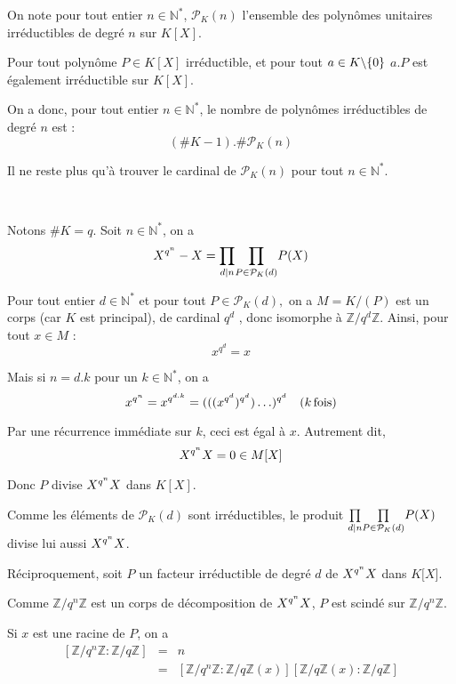On note pour tout entier $n \in \mathbb{N}^{\ast}$, $\mathcal{P}_K (n)$
l'ensemble des polyn{\^o}mes unitaires irr{\'e}ductibles de degr{\'e} $n$ sur
$K [X]$.

Pour tout polyn{\^o}me $P \in K [X]$ irr{\'e}ductible, et pour tout $a \in K
\backslash \nobracket \{ 0 \}$ $a.P$ est {\'e}galement irr{\'e}ductible sur $K
[X]$.

On a donc, pour tout entier $n \in \mathbb{N}^{\ast}$, le nombre de
polyn{\^o}mes irr{\'e}ductibles de degr{\'e} $n$ est :
\[ (\#K - 1) .\#\mathcal{P}_K (n) \]


Il ne reste plus qu'{\`a} trouver le cardinal de $\mathcal{P}_K (n)$ pour tout
$n \in \mathbb{N}^{\ast}$.

\


Notons $\#K = q$. Soit $n \in \mathbb{N}^{\ast}$, on a
\[ X^{q^n} - X = \underset{d | n \nobracket}{\prod}  \underset{P \in
   \mathcal{P}_K (d)}{\prod} P (X) \]



Pour tout entier $d \in \mathbb{N}^{\ast}$ et pour tout $P \in \mathcal{P}_K
(d),$ on a $M = K / (P)$ est un corps (car $K$ est principal), de cardinal
$q^d$ , donc isomorphe {\`a} $\mathbb{Z}/ q^d \mathbb{Z}$. Ainsi, pour tout $x
\in M$ :
\[ x^{q^d} = x \]


Mais si $n = d.k$ pour un $k \in \mathbb{N}^{\ast}$, on a \
\[ x^{q^n} = x^{q^{d.k}} = (((x^{q^d})^{q^d}) \ldots)^{q^d} \quad (k
   \tmop{fois}) \]


Par une r{\'e}currence imm{\'e}diate sur $k$, ceci est {\'e}gal {\`a} $x$.
Autrement dit,
\[ X^{q^n} \nonconverted{minus} X = 0 \in M [X] \]


Donc $P$ divise $X^{q^n} \nonconverted{minus} X$ dans $K [X]$.

Comme les {\'e}l{\'e}ments de $\mathcal{P}_K (d)$ sont irr{\'e}ductibles, le
produit $\underset{d | n \nobracket}{\prod}  \underset{P \in \mathcal{P}_K
(d)}{\prod} P (X)$ divise lui aussi $X^{q^n} \nonconverted{minus} X$.

R{\'e}ciproquement, soit $P$ un facteur irr{\'e}ductible de degr{\'e} $d$ de
$X^{q^n} \nonconverted{minus} X$ dans $K [X$].

Comme $\mathbb{Z}/ q^n \mathbb{Z}$ est un corps de d{\'e}composition de
$X^{q^n} \nonconverted{minus} X$, $P$ est scind{\'e} sur $\mathbb{Z}/ q^n
\mathbb{Z}$.

Si $x$ est une racine de $P$, on a
\begin{eqnarray*}
  {}[\mathbb{Z}/ q^n \mathbb{Z}: \mathbb{Z}/ q\mathbb{Z}] & = & n\\
  & = & [\mathbb{Z}/ q^n \mathbb{Z}: \mathbb{Z}/ q\mathbb{Z}(x)] [\mathbb{Z}/
  q\mathbb{Z}(x) : \mathbb{Z}/ q\mathbb{Z}]
\end{eqnarray*}


